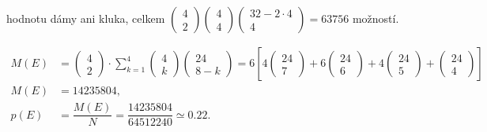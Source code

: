 \begin{example}
\begin{enumerate}
          hodnotu dámy ani kluka, celkem 
          \(\begin{pmatrix} 4 \\ 2 \end{pmatrix}
            \begin{pmatrix} 4 \\ 4\end{pmatrix}
            \begin{pmatrix} 32-2\cdot4 \\ 4 \end{pmatrix} = \num{63756}\) možností.
    \end{enumerate}
    \begin{align*}
      M(E) &= \begin{pmatrix} 4 \\ 2 \end{pmatrix}\cdot\sum^{4}_{k=1}
              \begin{pmatrix} 4 \\ k \end{pmatrix}\begin{pmatrix} 24 \\ 8 - k \end{pmatrix}
            = 6\left[ 
                  4\begin{pmatrix} 24 \\ 7 \end{pmatrix} +
                  6\begin{pmatrix} 24 \\ 6 \end{pmatrix} +
                  4\begin{pmatrix} 24 \\ 5 \end{pmatrix} +
                   \begin{pmatrix} 24 \\ 4 \end{pmatrix}
                \right]                                                      \\ 
      M(E) &= \num{14235804},                                                \\
      p(E) &= \dfrac{M(E)}{N} = \dfrac{\num{14235804}}{\num{64512240}} \simeq \num{0.22}.
    \end{align*}
    

\end{example}
